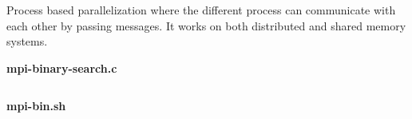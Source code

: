 \begin{usecases}
    Process based parallelization where the different process can communicate with each other by passing messages. It works on both distributed and shared memory systems. 
\end{usecases}

\begin{example}
    \noindent\textbf{mpi-binary-search.c}\vspace{-0.5em}
    \inputminted{c}{source_code/MPI/mpi-binary-search.c}

    \noindent\textbf{mpi-bin.sh}\vspace{-0.5em}
    \inputminted{bash}{source_code/MPI/mpi-bin.sh}
\end{example}